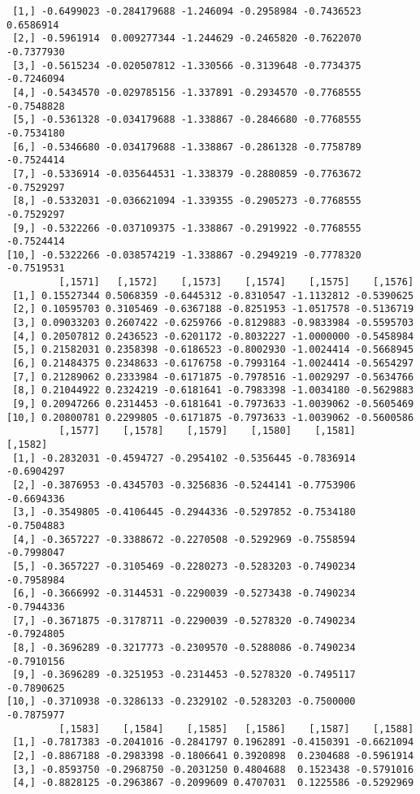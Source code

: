 \documentclass[
  letterpaper,
  DIV=11,
  numbers=noendperiod]{scrreprt}
\begin{document}
\begin{verbatim}
 [1,] -0.6499023 -0.284179688 -1.246094 -0.2958984 -0.7436523  0.6586914
 [2,] -0.5961914  0.009277344 -1.244629 -0.2465820 -0.7622070 -0.7377930
 [3,] -0.5615234 -0.020507812 -1.330566 -0.3139648 -0.7734375 -0.7246094
 [4,] -0.5434570 -0.029785156 -1.337891 -0.2934570 -0.7768555 -0.7548828
 [5,] -0.5361328 -0.034179688 -1.338867 -0.2846680 -0.7768555 -0.7534180
 [6,] -0.5346680 -0.034179688 -1.338867 -0.2861328 -0.7758789 -0.7524414
 [7,] -0.5336914 -0.035644531 -1.338379 -0.2880859 -0.7763672 -0.7529297
 [8,] -0.5332031 -0.036621094 -1.339355 -0.2905273 -0.7768555 -0.7529297
 [9,] -0.5322266 -0.037109375 -1.338867 -0.2919922 -0.7768555 -0.7524414
[10,] -0.5322266 -0.038574219 -1.338867 -0.2949219 -0.7778320 -0.7519531
         [,1571]   [,1572]    [,1573]    [,1574]    [,1575]    [,1576]
 [1,] 0.15527344 0.5068359 -0.6445312 -0.8310547 -1.1132812 -0.5390625
 [2,] 0.10595703 0.3105469 -0.6367188 -0.8251953 -1.0517578 -0.5136719
 [3,] 0.09033203 0.2607422 -0.6259766 -0.8129883 -0.9833984 -0.5595703
 [4,] 0.20507812 0.2436523 -0.6201172 -0.8032227 -1.0000000 -0.5458984
 [5,] 0.21582031 0.2358398 -0.6186523 -0.8002930 -1.0024414 -0.5668945
 [6,] 0.21484375 0.2348633 -0.6176758 -0.7993164 -1.0024414 -0.5654297
 [7,] 0.21289062 0.2333984 -0.6171875 -0.7978516 -1.0029297 -0.5634766
 [8,] 0.21044922 0.2324219 -0.6181641 -0.7983398 -1.0034180 -0.5629883
 [9,] 0.20947266 0.2314453 -0.6181641 -0.7973633 -1.0039062 -0.5605469
[10,] 0.20800781 0.2299805 -0.6171875 -0.7973633 -1.0039062 -0.5600586
         [,1577]    [,1578]    [,1579]    [,1580]    [,1581]    [,1582]
 [1,] -0.2832031 -0.4594727 -0.2954102 -0.5356445 -0.7836914 -0.6904297
 [2,] -0.3876953 -0.4345703 -0.3256836 -0.5244141 -0.7753906 -0.6694336
 [3,] -0.3549805 -0.4106445 -0.2944336 -0.5297852 -0.7534180 -0.7504883
 [4,] -0.3657227 -0.3388672 -0.2270508 -0.5292969 -0.7558594 -0.7998047
 [5,] -0.3657227 -0.3105469 -0.2280273 -0.5283203 -0.7490234 -0.7958984
 [6,] -0.3666992 -0.3144531 -0.2290039 -0.5273438 -0.7490234 -0.7944336
 [7,] -0.3671875 -0.3178711 -0.2290039 -0.5278320 -0.7490234 -0.7924805
 [8,] -0.3696289 -0.3217773 -0.2309570 -0.5288086 -0.7490234 -0.7910156
 [9,] -0.3696289 -0.3251953 -0.2314453 -0.5278320 -0.7495117 -0.7890625
[10,] -0.3710938 -0.3286133 -0.2329102 -0.5283203 -0.7500000 -0.7875977
         [,1583]    [,1584]    [,1585]   [,1586]    [,1587]    [,1588]
 [1,] -0.7817383 -0.2041016 -0.2841797 0.1962891 -0.4150391 -0.6621094
 [2,] -0.8867188 -0.2983398 -0.1806641 0.3920898  0.2304688 -0.5961914
 [3,] -0.8593750 -0.2968750 -0.2031250 0.4804688  0.1523438 -0.5791016
 [4,] -0.8828125 -0.2963867 -0.2099609 0.4707031  0.1225586 -0.5292969

\end{verbatim}
\end{document}
